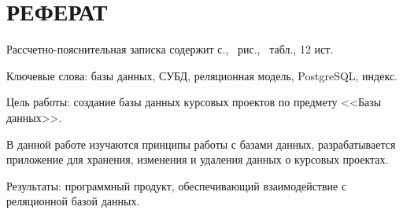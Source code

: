 
\chapter*{РЕФЕРАТ}

Рассчетно-пояснительная записка содержит \pageref{LastPage} с., \totalfigures \ рис., \totaltables\ табл., 12  ист.

Ключевые слова: базы данных, СУБД, реляционная модель, PostgreSQL, индекс.

Цель работы: создание базы данных курсовых проектов по предмету <<Базы данных>>.

В данной работе изучаются принципы работы с базами данных, разрабатывается приложение для хранения, изменения и удаления данных о курсовых проектах.

Результаты: программный продукт, обеспечивающий взаимодействие с реляционной базой данных.

\pagebreak